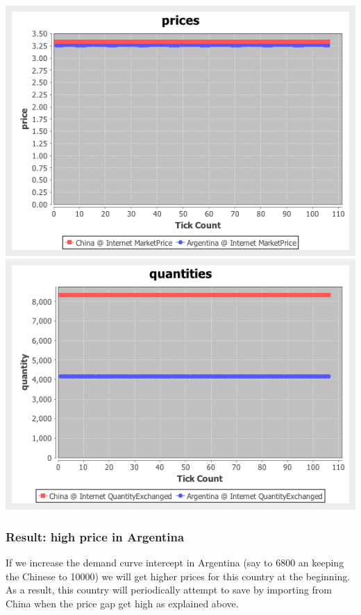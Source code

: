 \documentclass{article}
\begin{document}
\vskip2mm
\hskip-2cm
\includegraphics[scale=0.4]{fig_case3_prices}
\includegraphics[scale=0.4]{fig_case3_quantities}


\subsubsection{Result: high price in Argentina}

If we increase the demand curve intercept in Argentina (say to 6800 an keeping the Chinese to 10000) we will get higher prices for this country at the beginning. As a result, this country will periodically attempt to save by importing from China when the price gap get high as explained above.
\end{document}
